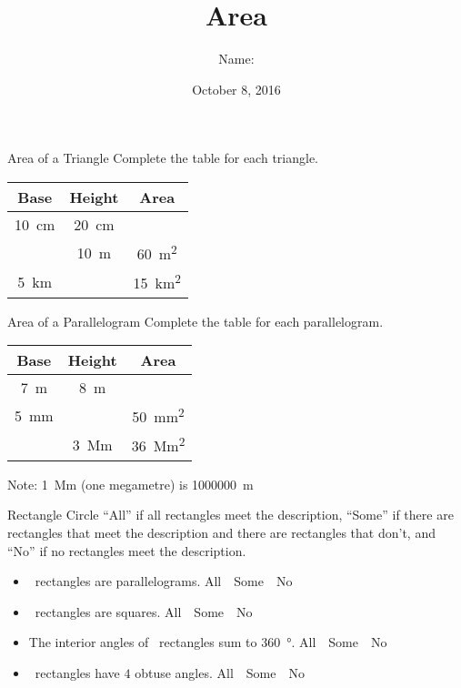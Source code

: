 \documentclass[14pt,letterpaper]{article}
\title{Area}
\author{Name: \underline{\hspace{5cm}}}
\date{October 8, 2016}
\begin{document}
\HomeworkTitle

\thispagestyle{empty}

\begin{problem}{Area of a Triangle}
 Complete the table for each triangle.

 \begin{center}
 \begin{tabular}{|c|c|c|}
  \hline
  Base & Height & Area \\
  \hline
  \SI{10}{\centi\metre} & \SI{20}{\centi\metre} & \\
  & \SI{10}{\metre} & \SI{60}{\metre\squared} \\
  \SI{5}{\kilo\metre} & & \SI{15}{\kilo\metre\squared} \\
  \hline
 \end{tabular}
 \end{center}
\end{problem}

\begin{problem}{Area of a Parallelogram}
 Complete the table for each parallelogram.

 \begin{center}
 \begin{tabular}{|c|c|c|}
  \hline
  Base & Height & Area \\
  \hline
  \SI{7}{\metre} & \SI{8}{\metre} & \\
  \SI{5}{\milli\metre} & & \SI{50}{\milli\metre\squared} \\
  & \SI{3}{\mega\metre} & \SI{36}{\mega\metre\squared} \\
  \hline
 \end{tabular}
 \end{center}
 Note: \SI{1}{\mega\metre} (one megametre) is \SI{1000000}{\metre}
\end{problem}

\begin{problem}{Rectangle}
 Circle ``All'' if all rectangles meet the description, ``Some'' if there are
 rectangles that meet the description and there are rectangles that don't, and
 ``No'' if no rectangles meet the description.

 \begin{itemize}
  \item \blankC~rectangles are parallelograms. \hfill All~~Some~~No
  \item \blankC~rectangles are squares. \hfill All~~Some~~No
  \item The interior angles of \blankC~rectangles sum to \SI{360}{\degree}.
  \hfill All~~Some~~No
  \item \blankC~rectangles have $4$ obtuse angles. \hfill All~~Some~~No
 \end{itemize}
\end{problem}
\end{document}
